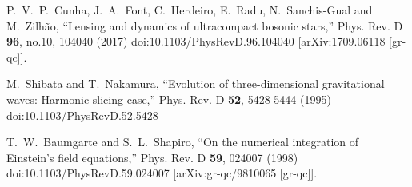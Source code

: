 \begin{thebibliography}{9}
P.~V.~P.~Cunha, J.~A.~Font, C.~Herdeiro, E.~Radu, N.~Sanchis-Gual and M.~Zilh\~ao,
``Lensing and dynamics of ultracompact bosonic stars,''
Phys. Rev. D \textbf{96}, no.10, 104040 (2017)
doi:10.1103/PhysRevD.96.104040
[arXiv:1709.06118 [gr-qc]].

M.~Shibata and T.~Nakamura,
``Evolution of three-dimensional gravitational waves: Harmonic slicing case,''
Phys. Rev. D \textbf{52}, 5428-5444 (1995)
doi:10.1103/PhysRevD.52.5428

T.~W.~Baumgarte and S.~L.~Shapiro,
``On the numerical integration of Einstein's field equations,''
Phys. Rev. D \textbf{59}, 024007 (1998)
doi:10.1103/PhysRevD.59.024007
[arXiv:gr-qc/9810065 [gr-qc]].

\end{thebibliography}




